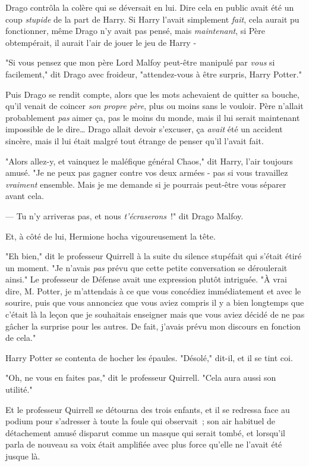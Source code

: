 Drago contrôla la colère qui se déversait en lui. Dire cela en public avait été un coup \emph{stupide} de la part de Harry. Si Harry l'avait simplement \emph{fait}, cela aurait pu fonctionner, même Drago n'y avait pas pensé, mais \emph{maintenant}, si Père obtempérait, il aurait l'air de jouer le jeu de Harry -

"Si vous pensez que mon père Lord Malfoy peut-être manipulé par \emph{vous} si facilement," dit Drago avec froideur, "attendez-vous à être surpris, Harry Potter."

Puis Drago se rendit compte, alors que les mots achevaient de quitter sa bouche, qu'il venait de coincer \emph{son propre père}, plus ou moins sans le vouloir. Père n'allait probablement \emph{pas} aimer ça, pas le moins du monde, mais il lui serait maintenant impossible de le dire… Drago allait devoir s'excuser, ça \emph{avait} été un accident sincère, mais il lui était malgré tout étrange de penser qu'il l'avait fait.

"Alors allez-y, et vainquez le maléfique général Chaos," dit Harry, l'air toujours amusé. "Je ne peux pas gagner contre vos deux armées - pas si vous travaillez \emph{vraiment} ensemble. Mais je me demande si je pourrais peut-être vous séparer avant cela.

--- Tu n'y arriveras pas, et nous \emph{t'écraserons}~!" dit Drago Malfoy.

Et, à côté de lui, Hermione hocha vigoureusement la tête.

"Eh bien," dit le professeur Quirrell à la suite du silence stupéfait qui s'était étiré un moment. "Je n'avais \emph{pas} prévu que cette petite conversation se déroulerait ainsi." Le professeur de Défense avait une expression plutôt intriguée. "À vrai dire, M. Potter, je m'attendais à ce que vous concédiez immédiatement et avec le sourire, puis que vous annonciez que vous aviez compris il y a bien longtemps que c'était là la leçon que je souhaitais enseigner mais que vous aviez décidé de ne pas gâcher la surprise pour les autres. De fait, j'avais prévu mon discours en fonction de cela."

Harry Potter se contenta de hocher les épaules. "Désolé," dit-il, et il se tint coi.

"Oh, ne vous en faites pas," dit le professeur Quirrell. "Cela aura aussi son utilité."

Et le professeur Quirrell se détourna des trois enfants, et il se redressa face au podium pour s'adresser à toute la foule qui observait~; son air habituel de détachement amusé disparut comme un masque qui serait tombé, et lorsqu'il parla de nouveau sa voix était amplifiée avec plus force qu'elle ne l'avait été jusque là.

